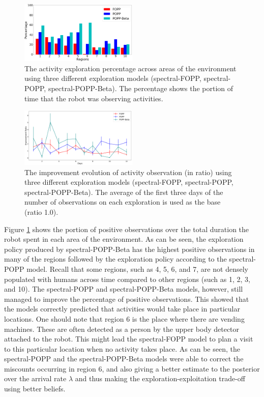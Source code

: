 \begin{figure}[t!]
	\centering
	\includegraphics[width=0.5\textwidth]{./figures/exploration_percentage_region.png}
	\caption{The activity exploration percentage across areas of the environment using three different exploration models (spectral-FOPP, spectral-POPP, spectral-POPP-Beta). The percentage shows the portion of time that the robot was observing activities.}
	\label{fig:exploration_percentage_region}
\end{figure}

\begin{figure}[t!]
	\centering
	\includegraphics[width=0.5\textwidth]{./figures/exploration_improvement_ratio.png}
	\caption{The improvement evolution of activity observation (in ratio) using three different exploration models (spectral-FOPP, spectral-POPP, spectral-POPP-Beta). The average of the first three days of the number of observations on each exploration is used as the base (ratio 1.0).}
	\label{fig:exploration_improvement_ratio}
\end{figure}

Figure \ref{fig:exploration_percentage_region} shows the portion of positive observations over the total duration the robot spent in each area of the environment. As can be seen, the exploration policy produced by spectral-POPP-Beta has the highest positive observations in many of the regions followed by the exploration policy according to the spectral-POPP model. Recall that some regions, such as 4, 5, 6, and 7, are not densely populated with humans across time compared to other regions (such as 1, 2, 3, and 10). The spectral-POPP and spectral-POPP-Beta models, however, still managed to improve the percentage of positive observations. This showed that the models correctly predicted that activities would take place in particular locations. One should note that region 6 is the place where there are vending machines. These are often detected as a person by the upper body detector attached to the robot. This might lead the spectral-FOPP model to plan a visit to this particular location when no activity takes place. As can be seen, the spectral-POPP and the spectral-POPP-Beta models were able to correct the miscounts occurring in region 6, and also giving a better estimate to the posterior over the arrival rate $\lambda$ and thus making the exploration-exploitation trade-off using better beliefs.